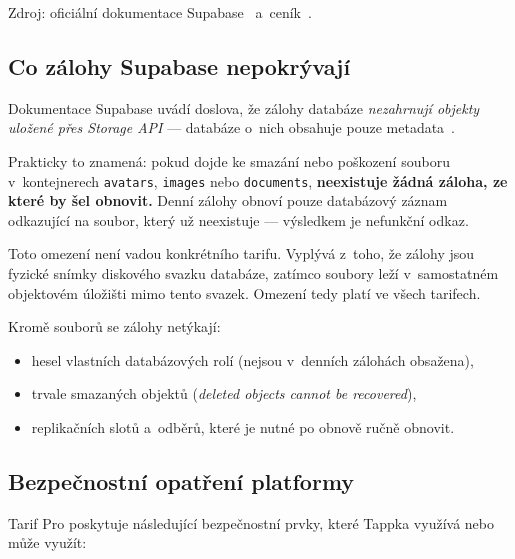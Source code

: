 \documentclass[11pt,a4paper]{article}
\begin{document}
Zdroj: oficiální dokumentace Supabase~\cite{zalohysupabase} a~ceník~\cite{cenik}.

\subsection{Co zálohy Supabase nepokrývají}
\label{sec:storage-nezalohy}

\begin{upozorneni}
Dokumentace Supabase uvádí doslova, že zálohy databáze \emph{nezahrnují objekty uložené přes
Storage API} --- databáze o~nich obsahuje pouze metadata~\cite{zalohysupabase}.

\smallskip
Prakticky to znamená: pokud dojde ke smazání nebo poškození souboru v~kontejnerech
\texttt{avatars}, \texttt{images} nebo \texttt{documents}, \textbf{neexistuje žádná záloha, ze
které by šel obnovit.} Denní zálohy obnoví pouze databázový záznam odkazující na soubor, který už
neexistuje --- výsledkem je nefunkční odkaz.

\smallskip
Toto omezení není vadou konkrétního tarifu. Vyplývá z~toho, že zálohy jsou fyzické snímky
diskového svazku databáze, zatímco soubory leží v~samostatném objektovém úložišti mimo tento
svazek. Omezení tedy platí ve všech tarifech.
\end{upozorneni}

Kromě souborů se zálohy netýkají:
\begin{itemize}
  \item hesel vlastních databázových rolí (nejsou v~denních zálohách obsažena),
  \item trvale smazaných objektů (\emph{deleted objects cannot be recovered}),
  \item replikačních slotů a~odběrů, které je nutné po obnově ručně obnovit.
\end{itemize}

\subsection{Bezpečnostní opatření platformy}

Tarif Pro poskytuje následující bezpečnostní prvky, které Tappka využívá nebo může využít:
\end{document}
